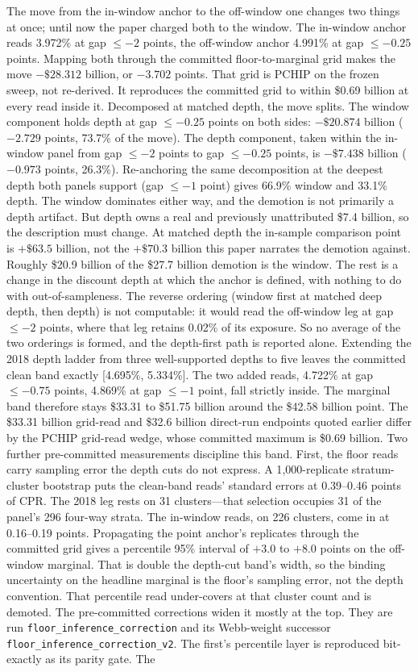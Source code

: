 \documentclass[12pt]{article}
\begin{document}
The move from the in-window anchor to the off-window one changes two things at once; until now the paper charged both to the window. The in-window anchor reads 3.972\% at gap $\leq -2$ points, the off-window anchor 4.991\% at gap $\leq -0.25$ points. Mapping both through the committed floor-to-marginal grid makes the move $-\$28.312$ billion, or $-3.702$ points. That grid is PCHIP on the frozen sweep, not re-derived. It reproduces the committed grid to within \$0.69 billion at every read inside it. Decomposed at matched depth, the move splits. The window component holds depth at gap $\leq -0.25$ points on both sides: $-\$20.874$ billion ($-2.729$ points, 73.7\% of the move). The depth component, taken within the in-window panel from gap $\leq -2$ points to gap $\leq -0.25$ points, is $-\$7.438$ billion ($-0.973$ points, 26.3\%). Re-anchoring the same decomposition at the deepest depth both panels support (gap $\leq -1$ point) gives 66.9\% window and 33.1\% depth. The window dominates either way, and the demotion is not primarily a depth artifact. But depth owns a real and previously unattributed \$7.4 billion, so the description must change. At matched depth the in-sample comparison point is $+\$63.5$ billion, not the $+\$70.3$ billion this paper narrates the demotion against. Roughly \$20.9 billion of the \$27.7 billion demotion is the window. The rest is a change in the discount depth at which the anchor is defined, with nothing to do with out-of-sampleness. The reverse ordering (window first at matched deep depth, then depth) is not computable: it would read the off-window leg at gap $\leq -2$ points, where that leg retains 0.02\% of its exposure. So no average of the two orderings is formed, and the depth-first path is reported alone. Extending the 2018 depth ladder from three well-supported depths to five leaves the committed clean band exactly [4.695\%, 5.334\%]. The two added reads, 4.722\% at gap $\leq -0.75$ points, 4.869\% at gap $\leq -1$ point, fall strictly inside. The marginal band therefore stays \$33.31 to \$51.75 billion around the \$42.58 billion point. The \$33.31 billion grid-read and \$32.6 billion direct-run endpoints quoted earlier differ by the PCHIP grid-read wedge, whose committed maximum is \$0.69 billion. Two further pre-committed measurements discipline this band. First, the floor reads carry sampling error the depth cuts do not express. A 1{,}000-replicate stratum-cluster bootstrap puts the clean-band reads' standard errors at 0.39--0.46 points of CPR. The 2018 leg rests on 31 clusters---that selection occupies 31 of the panel's 296 four-way strata. The in-window reads, on 226 clusters, come in at 0.16--0.19 points. Propagating the point anchor's replicates through the committed grid gives a percentile 95\% interval of $+3.0$ to $+8.0$ points on the off-window marginal. That is double the depth-cut band's width, so the binding uncertainty on the headline marginal is the floor's sampling error, not the depth convention. That percentile read under-covers at that cluster count and is demoted. The pre-committed corrections widen it mostly at the top. They are run \texttt{floor\_inference\_correction} and its Webb-weight successor \texttt{floor\_inference\_correction\_v2}. The first's percentile layer is reproduced bit-exactly as its parity gate. The 
\end{document}
